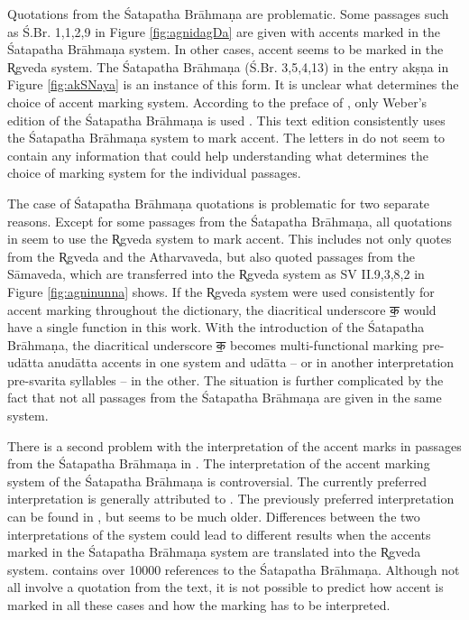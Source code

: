 Quotations from the Śatapatha Brāhmaṇa are problematic. Some passages such as Ś.Br. 1,1,2,9 in Figure \ref{fig:agnidagDa} are given with accents marked in the Śatapatha Brāhmaṇa system. In other cases, accent seems to be marked in the R̥gveda system. The Śatapatha Brāhmaṇa (Ś.Br. 3,5,4,13) in the entry akṣṇa in Figure \ref{fig:akSNaya} is an instance of this form. It is unclear what determines the choice of accent marking system. According to the preface of \citet{pwg}, only Weber’s edition of the Śatapatha Brāhmaṇa is used \citep{Weber1849}. This text edition consistently uses the Śatapatha Brāhmaṇa system to mark accent. The letters in \cite{BruecknerZeller2007} do not seem to contain any information that could help understanding what determines the choice of marking system for the individual passages.

The case of Śatapatha Brāhmaṇa quotations is problematic for two separate reasons. Except for some passages from the Śatapatha Brāhmaṇa, all quotations in \citet{pwg} seem to use the R̥gveda system to mark accent. This includes not only quotes from the R̥gveda and the Atharvaveda, but also quoted passages from the Sāmaveda, which are transferred into the R̥gveda system as SV II.9,3,8,2 in Figure \ref{fig:agninunna} shows. If the R̥gveda system were used consistently for accent marking throughout the dictionary, the diacritical underscore {\devfont क॒} would have a single function in this work. With the introduction of the Śatapatha Brāhmaṇa, the diacritical underscore {\devfont क॒} becomes multi-functional marking pre-udātta anudātta accents in one system and udātta – or in another interpretation pre-svarita syllables – in the other. The situation is further complicated by the fact that not all passages from the Śatapatha Brāhmaṇa are given in the same system.

There is a second problem with the interpretation of the accent marks in passages from the Śatapatha Brāhmaṇa in \citet{pwg}. The interpretation of the accent marking system of the Śatapatha Brāhmaṇa is controversial. The currently preferred interpretation is generally attributed to \citet{Hoffmann1956}. The previously preferred interpretation can be found in \citet[p.~451]{Macdonell1916}, but seems to be much older. Differences between the two interpretations of the system could lead to different results when the accents marked in the Śatapatha Brāhmaṇa system are translated into the R̥gveda system. \citet{pwg} contains over 10000 references to the Śatapatha Brāhmaṇa. Although not all involve a quotation from the text, it is not possible to predict how accent is marked in all these cases and how the marking has to be interpreted.

